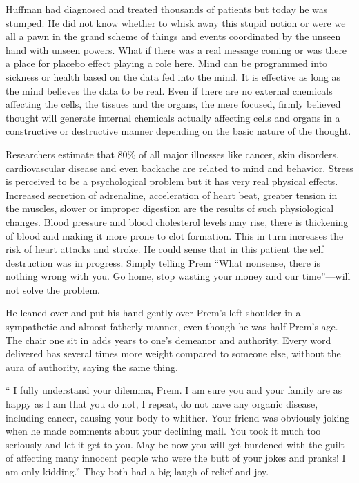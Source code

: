 Huffman had diagnosed and treated thousands of patients but today he was
stumped. He did not know whether to whisk away this stupid notion or
were we all a pawn in the grand scheme of things and events coordinated
by the unseen hand with unseen powers. What if there was a real message
coming or was there a place for placebo effect playing a role here. Mind
can be programmed into sickness or health based on the data fed into the
mind. It is effective as long as the mind believes the data to be real.
Even if there are no external chemicals affecting the cells, the tissues
and the organs, the mere focused, firmly believed thought will generate
internal chemicals actually affecting cells and organs in a constructive
or destructive manner depending on the basic nature of the thought.

Researchers estimate that 80\% of all major illnesses like cancer, skin
disorders, cardiovascular disease and even backache are related to mind
and behavior. Stress is perceived to be a psychological problem but it
has very real physical effects. Increased secretion of adrenaline,
acceleration of heart beat, greater tension in the muscles, slower or
improper digestion are the results of such physiological changes. Blood
pressure and blood cholesterol levels may rise, there is thickening of
blood and making it more prone to clot formation. This in turn increases
the risk of heart attacks and stroke. He could sense that in this
patient the self destruction was in progress. Simply telling Prem ``What
nonsense, there is nothing wrong with you. Go home, stop wasting your
money and our time''---will not solve the problem.

He leaned over and put his hand gently over Prem's left shoulder in a
sympathetic and almost fatherly manner, even though he was half Prem's
age. The chair one sit in adds years to one's demeanor and authority.
Every word delivered has several times more weight compared to someone
else, without the aura of authority, saying the same thing.

`` I fully understand your dilemma, Prem. I am sure you and your family
are as happy as I am that you do not, I repeat, do not have any organic
disease, including cancer, causing your body to whither. Your friend was
obviously joking when he made comments about your declining mail. You
took it much too seriously and let it get to you. May be now you will
get burdened with the guilt of affecting many innocent people who were
the butt of your jokes and pranks! I am only kidding.'' They both had a
big laugh of relief and joy.

